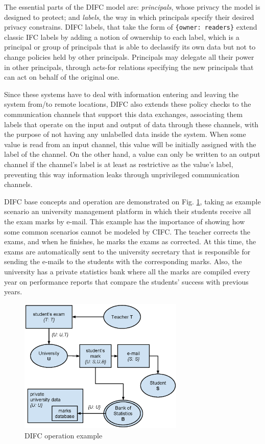 The essential parts of the DIFC model are: \textit{principals}, whose privacy the model is designed to protect; and \textit{labels}, the way in which principals specify their desired privacy constrains. DIFC labels, that take the form of \texttt{\{owner: readers\}} extend classic IFC labels by adding a notion of ownership to each label, which is a principal or group of principals that is able to declassify its own data but not to change policies held by other principals. Principals may delegate all their power in other principals, through acts-for relations specifying the new principals that can act on behalf of the original one.

Since these systems have to deal with information entering and leaving the system from/to remote locations, DIFC also extends these policy checks to the communication channels that support this data exchanges, associating them labels that operate on the input and output of data through these channels, with the purpose of not having any unlabelled data inside the system. When some value is read from an input channel, this value will be initially assigned with the label of the channel. On the other hand, a value can only be written to an output channel if the channel's label is at least as restrictive as the value's label, preventing this way information leaks through unprivileged communication channels.

DIFC base concepts and operation are demonstrated on Fig. \ref{fig:difc-model}, taking as example scenario an university management platform in which their students receive all the exam marks by e-mail. This example has the importance of showing how some common scenarios cannot be modeled by CIFC. The teacher corrects the exams, and when he finishes, he marks the exams as corrected. At this time, the exams are automatically sent to the university secretary that is responsible for sending the e-mails to the students with the corresponding marks. Also, the university has a private statistics bank where all the marks are compiled every year on performance reports that compare the students' success with previous years.

\begin{figure}[t!]
\includegraphics[width=0.7\textwidth]{figs/difc-model}
\centering
\caption{DIFC operation example}
\label{fig:difc-model}
\end{figure}

